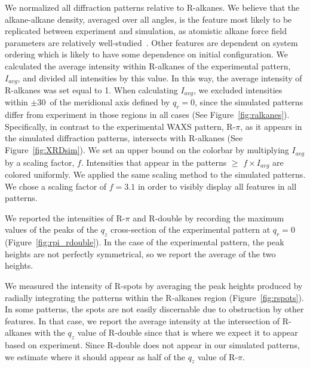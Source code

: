 \documentclass[journal=jpcbfk,manuscript=article]{achemso}
\begin{document}
  We normalized all diffraction patterns relative to R-alkanes. We believe that
  the alkane-alkane density, averaged over all angles, is the feature most likely
  to be replicated between experiment and simulation, as atomistic alkane force
  field parameters are relatively well-studied~\cite{wang_development_2004}.
  Other features are dependent on system ordering which is likely to have some
  dependence on initial configuration.  We calculated the average intensity
  within R-alkanes of the experimental pattern, $I_{avg}$, and divided all
  intensities by this value. In this way, the average intensity of R-alkanes was
  set equal to 1. When calculating $I_{avg}$, we excluded intensities within
  $\pm$30\degree~of the meridional axis defined by $q_r=0$, since the simulated
  patterns differ from experiment in those regions in all cases (See
  Figure~\ref{fig:ralkanes}). Specifically, in contrast to the experimental WAXS
  pattern, R-$\pi$, as it appears in the simulated diffraction patterns,
  intersects with R-alkanes (See Figure~\ref{fig:XRDsim}). We set an upper bound
  on the colorbar by multiplying $I_{avg}$ by a scaling factor, $f$.  Intensities
  that appear in the patterns $\geq$ $f\times I_{avg}$ are colored uniformly.  We
  applied the same scaling method to the simulated patterns. We chose a scaling
  factor of $f=3.1$ in order to visibly display all features in all patterns.

  We reported the intensities of R-$\pi$ and R-double by recording the maximum values
  of the peaks of the $q_z$ cross-section of the experimental pattern at $q_r=0$ 
  (Figure~\ref{fig:rpi_rdouble}). In the case of the experimental pattern, the peak
  heights are not perfectly symmetrical, so we report the average of the two heights.

  We measured the intensity of R-spots by averaging the peak heights produced
  by radially integrating the patterns within the R-alkanes region
  (Figure~\ref{fig:rspots}). In some patterns, the spots are not easily
  discernable due to obstruction by other features. In that case, we report the
  average intensity at the intersection of R-alkanes with the $q_z$ value of
  R-double since that is where we expect it to appear based on experiment. Since
  R-double does not appear in our simulated patterns, we estimate where it should
  appear as half of the $q_z$ value of R-$\pi$.
\end{document}
